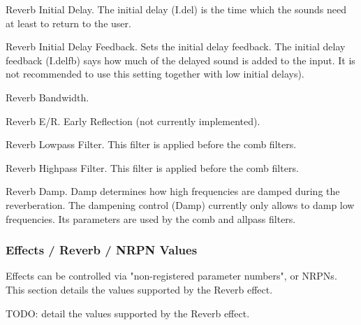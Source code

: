    Reverb Initial Delay.
   The initial delay (I.del) is the time which the sounds need at least to
   return to the user.

   Reverb Initial Delay Feedback.
   Sets the initial delay feedback.
   The initial delay feedback (I.delfb) says how much
   of the delayed sound is added to the input.
   It is not recommended to use this setting together with
   low initial delays).

   Reverb Bandwidth.

   Reverb E/R.
   Early Reflection (not currently implemented).

   Reverb Lowpass Filter.
   This filter is applied before the comb filters.

   Reverb Highpass Filter.
   This filter is applied before the comb filters.

   Reverb Damp.
   Damp determines how high frequencies are damped during the
   reverberation.  The dampening control (Damp) currently only allows to
   damp low frequencies. Its parameters are used by the comb and allpass
   filters.
\iffalse
??? This doesn't belong here.
   \itempar{FX No}{reverb!fx no.}
   Reverb FX Number.

   Values: \texttt{1 to 8?}

   \itempar{bypass}{reverb!fx bypass}
   Reverb FX Bypass.

   Values: \texttt{Off*, On}

   \itempar{EffType}{reverb!eff type}
   Reverb Effect Type.

   Values: \texttt{Reverb, EQ, Echo, etc. TODO}

   \itempar{Send To}{reverb!send to}
   Reverb Send To.
   This user-interface drop-down is shown only in the
   \textbf{Part / Edit / Effects} version of the effects panel.

   Values: \texttt{Next Effect, Part Out, Dry Out}

   \itempar{C}{reverb!copy}
   Reverb Copy.

   \itempar{P}{reverb!paste}
   Reverb Paste.

   \itempar{Close}{reverb!close}
   Close Window.
\fi
\subsubsection{Effects / Reverb / NRPN Values}
\label{subsubsec:effects_edit_reverb_nrpn}

   Effects can be controlled via "non-registered parameter numbers", or NRPNs.
   This section details the values supported by the Reverb effect.

   TODO:  detail the values supported by the Reverb effect.

